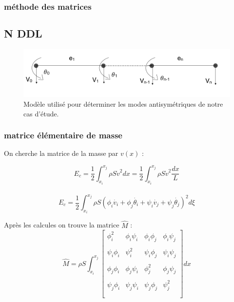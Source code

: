 \documentclass[a4paper,10pt]{report} %
\begin{document}
\subsubsection{méthode des matrices}



\subsection{N DDL}

\begin{figure}[H]
\begin{center}
	\includegraphics[width=1\textwidth]{CasthetaN.png} 
\end{center} 
\caption{Modèle utilisé pour déterminer les modes antisymétriques de notre cas d'étude.}
\end{figure}



\subsubsection{ matrice élémentaire de masse}
On cherche la matrice de la masse  par $v(x)$ :
\begin{center}
$$E_c=\frac{1}{2}\int_{x_i}^{x_j}\rho S\dot{v}^2dx=\frac{1}{2}\int_{x_i}^{x_j}\rho S\dot{v}^2\frac{dx}{L}$$\\
$$E_c=\frac{1}{2}\int_{x_i}^{x_j}\rho S(\phi_i\dot{v_i}+\phi_j\dot{\theta_i}+\psi_i\dot{v_j}+\psi_j\dot{\theta_j})^2d\xi$$
\end{center}

Après les calcules on trouve la matrice $\widehat{M}$ :
\[ \widehat{M}=\rho S\int_{x_i}^{x_j}\left[ \begin{array}{cccc}
\phi_i^2 &\phi_i\psi_i& \phi_i\phi_j&\phi_i\psi_j     \\\\
\psi_i\phi_i & \psi_i^2& \psi_i\phi_j&\psi_i\psi_j \\\\
\phi_j\phi_i &\phi_j\psi_i& \phi_j^2&\phi_j\psi_j     \\\\
\psi_j\phi_i &\psi_j\psi_i&\psi_j \phi_j&\psi_j^2    \\\\
 \end{array} \right]dx\]
 
\end{document}
